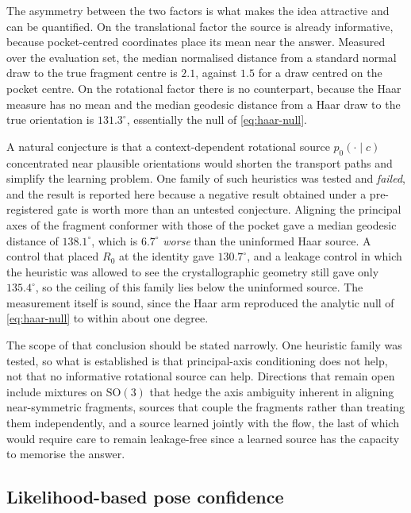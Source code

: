 \documentclass[11pt,a4paper]{report}
\theoremstyle{plain}
\theoremstyle{definition}
\theoremstyle{remark}
\newcommand{\SOthree}{\mathrm{SO}(3)}
\newcommand{\ctx}{c}
\newcommand{\Rot}{R}
\newcommand{\Ang}[1]{\ensuremath{#1^{\circ}}}
\begin{document}
The asymmetry between the two factors is what makes the idea attractive and can
be quantified. On the translational factor the source is already informative,
because pocket-centred coordinates place its mean near the answer. Measured
over the evaluation set, the median normalised distance from a standard normal
draw to the true fragment centre is $2.1$, against $1.5$ for a draw centred on
the pocket centre. On the rotational factor there is no counterpart, because
the Haar measure has no mean and the median geodesic distance from a Haar draw
to the true orientation is $\Ang{131.3}$, essentially the null of
\eqref{eq:haar-null}.

A natural conjecture is that a context-dependent rotational source
$p_0(\cdot\mid\ctx)$ concentrated near plausible orientations would shorten the
transport paths and simplify the learning problem. One family of such
heuristics was tested and \emph{failed}, and the result is reported here
because a negative result obtained under a pre-registered gate is worth more
than an untested conjecture. Aligning the principal axes of the fragment
conformer with those of the pocket gave a median geodesic distance of
$\Ang{138.1}$, which is $\Ang{6.7}$ \emph{worse} than the uninformed Haar
source. A control that placed $\Rot_0$ at the identity gave $\Ang{130.7}$, and
a leakage control in which the heuristic was allowed to see the
crystallographic geometry still gave only $\Ang{135.4}$, so the ceiling of this
family lies below the uninformed source. The measurement itself is sound, since
the Haar arm reproduced the analytic null of \eqref{eq:haar-null} to within
about one degree.

The scope of that conclusion should be stated narrowly. One heuristic family
was tested, so what is established is that principal-axis conditioning does not
help, not that no informative rotational source can help. Directions that
remain open include mixtures on $\SOthree$ that hedge the axis ambiguity
inherent in aligning near-symmetric fragments, sources that couple the
fragments rather than treating them independently, and a source learned jointly
with the flow, the last of which would require care to remain leakage-free
since a learned source has the capacity to memorise the answer.

\subsection{Likelihood-based pose confidence}
\label{sec:future-likelihood}
\end{document}
